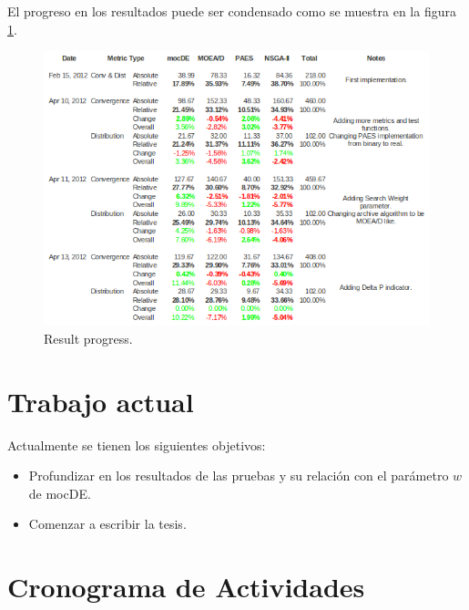 \documentclass[english]{article}
\begin{document}

El progreso en los resultados puede ser condensado como se muestra en la figura \ref{fig:progress}.

\begin{figure}
\includegraphics[scale=0.6]{images/progress}
\caption{\label{fig:progress} Result progress.}
\end{figure}


\section*{Trabajo actual}

Actualmente se tienen los siguientes objetivos:
\begin{itemize}
\item Profundizar en los resultados de las pruebas y su relación con el parámetro $w$ de mocDE.
\item Comenzar a escribir la tesis.
\end{itemize}


\section*{Cronograma de Actividades}
\end{document}
